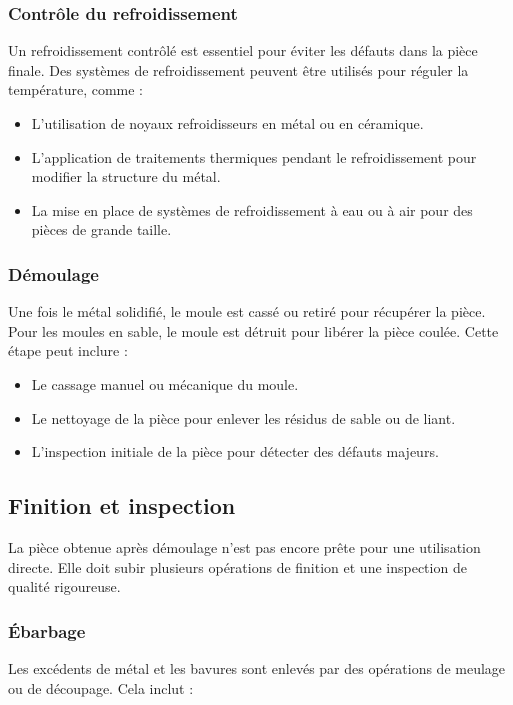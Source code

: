 \documentclass[12pt]{article}
\begin{document}
\subsubsection{Contrôle du refroidissement}
Un refroidissement contrôlé est essentiel pour éviter les défauts dans la pièce finale. Des systèmes de refroidissement peuvent être utilisés pour réguler la température, comme :

\begin{itemize}
    \item L'utilisation de noyaux refroidisseurs en métal ou en céramique.
    \item L'application de traitements thermiques pendant le refroidissement pour modifier la structure du métal.
    \item La mise en place de systèmes de refroidissement à eau ou à air pour des pièces de grande taille.
\end{itemize}

\subsubsection{Démoulage}
Une fois le métal solidifié, le moule est cassé ou retiré pour récupérer la pièce. Pour les moules en sable, le moule est détruit pour libérer la pièce coulée. Cette étape peut inclure :

\begin{itemize}
    \item Le cassage manuel ou mécanique du moule.
    \item Le nettoyage de la pièce pour enlever les résidus de sable ou de liant.
    \item L'inspection initiale de la pièce pour détecter des défauts majeurs.
\end{itemize}

\subsection{Finition et inspection}
La pièce obtenue après démoulage n'est pas encore prête pour une utilisation directe. Elle doit subir plusieurs opérations de finition et une inspection de qualité rigoureuse.

\subsubsection{Ébarbage}
Les excédents de métal et les bavures sont enlevés par des opérations de meulage ou de découpage. Cela inclut :
\end{document}
